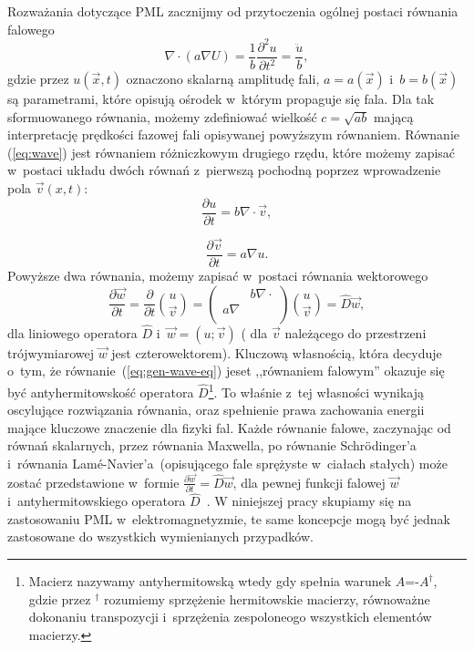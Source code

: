 Rozważania dotyczące PML zacznijmy od przytoczenia ogólnej postaci równania falowego~\cite{barton1989elements}
\begin{equation}
\nabla \cdot ( a \nabla U) = \frac{1}{b} \frac{\partial^2 u}{\partial t^2} = \frac{\ddot{u}}{b},
\label{eq:wave}
\end{equation}
gdzie przez $u(\vec{x},t)$ oznaczono skalarną amplitudę fali, $a=a(\vec{x})$ i~$b=b(\vec{x})$ są parametrami, które opisują ośrodek w~którym propaguje się fala. Dla tak sformuowanego równania, możemy zdefiniować wielkość $c=\sqrt{ab}$ mającą interpretację prędkości fazowej fali opisywanej powyższym równaniem. Równanie (\ref{eq:wave}) jest równaniem różniczkowym drugiego rzędu, które możemy zapisać w~postaci układu dwóch równań z~pierwszą pochodną poprzez wprowadzenie pola $\vec{v}(x,t)$:
\begin{equation}
\frac{\partial u}{\partial t} = b \nabla \cdot \vec{v},
\end{equation}

\begin{equation}
\frac{\partial \vec{v}}{\partial t}= a\nabla u.
\end{equation}
Powyższe dwa równania, możemy zapisać  w~postaci równania wektorowego
\begin{equation}
\frac{\partial \vec{w}}{\partial t}=\frac{\partial}{\partial t} {u \choose \vec{v}} = 
	\begin{pmatrix}
		& b\nabla\cdot \\
	a\nabla & \\
	\end{pmatrix}
{u \choose \vec{v}} = \hat{D}\vec{w},
\label{eq:gen-wave-eq}
\end{equation}
dla liniowego operatora $\hat{D}$ i~$\vec{w}=(u;\vec{v})$ ( dla $\vec{v}$ należącego do przestrzeni trójwymiarowej $\vec{w}$ jest czterowektorem). Kluczową własnością, która decyduje o~tym, że równanie~(\ref{eq:gen-wave-eq}) jeset ,,równaniem falowym''  okazuje się być antyhermitowskość operatora $\hat{D}$\footnote{Macierz nazywamy antyhermitowską wtedy gdy spełnia warunek $A$=-$A^\dag$, gdzie przez $^\dag$ rozumiemy sprzężenie hermitowskie macierzy, równoważne dokonaniu transpozycji i~sprzężenia zespoloneogo wszystkich elementów macierzy.}. To właśnie z~tej własności wynikają oscylujące rozwiązania równania, oraz spełnienie prawa zachowania energii mające kluczowe znaczenie dla fizyki fal. Każde równanie falowe, zaczynając od równań skalarnych, przez równania Maxwella,  po równanie Schr\"{o}dinger'a i~równania Lam\'{e}-Navier'a~(opisującego fale sprężyste w~ciałach stałych) może zostać przedstawione w~formie $ \frac{\partial  \vec{w}}{\partial t}=\hat{D}\vec{w}$, dla pewnej funkcji falowej $\vec{w}$ i~antyhermitowskiego operatora $\hat{D}$~\cite{johnson2007notes}. W niniejszej pracy skupiamy się na zastosowaniu PML w~elektromagnetyzmie, te same koncepcje mogą być jednak zastosowane do wszystkich wymienianych przypadków.

